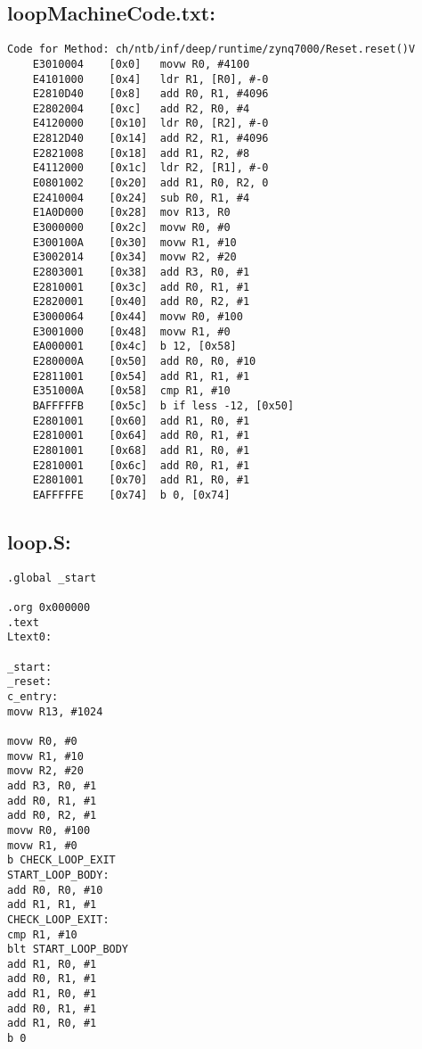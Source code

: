 \subsection{loopMachineCode.txt:}
\label{anhang:loopMachineCode.txt}
\lstset{language=plain}
\begin{lstlisting}
Code for Method: ch/ntb/inf/deep/runtime/zynq7000/Reset.reset()V
	E3010004	[0x0]	movw R0, #4100
	E4101000	[0x4]	ldr R1, [R0], #-0
	E2810D40	[0x8]	add R0, R1, #4096
	E2802004	[0xc]	add R2, R0, #4
	E4120000	[0x10]	ldr R0, [R2], #-0
	E2812D40	[0x14]	add R2, R1, #4096
	E2821008	[0x18]	add R1, R2, #8
	E4112000	[0x1c]	ldr R2, [R1], #-0
	E0801002	[0x20]	add R1, R0, R2, 0
	E2410004	[0x24]	sub R0, R1, #4
	E1A0D000	[0x28]	mov R13, R0
	E3000000	[0x2c]	movw R0, #0
	E300100A	[0x30]	movw R1, #10
	E3002014	[0x34]	movw R2, #20
	E2803001	[0x38]	add R3, R0, #1
	E2810001	[0x3c]	add R0, R1, #1
	E2820001	[0x40]	add R0, R2, #1
	E3000064	[0x44]	movw R0, #100
	E3001000	[0x48]	movw R1, #0
	EA000001	[0x4c]	b 12, [0x58]	
	E280000A	[0x50]	add R0, R0, #10
	E2811001	[0x54]	add R1, R1, #1
	E351000A	[0x58]	cmp R1, #10
	BAFFFFFB	[0x5c]	b if less -12, [0x50]	
	E2801001	[0x60]	add R1, R0, #1
	E2810001	[0x64]	add R0, R1, #1
	E2801001	[0x68]	add R1, R0, #1
	E2810001	[0x6c]	add R0, R1, #1
	E2801001	[0x70]	add R1, R0, #1
	EAFFFFFE	[0x74]	b 0, [0x74]	
\end{lstlisting}


\subsection{loop.S:}
\label{anhang:loop.S}
\begin{lstlisting}
.global _start

.org 0x000000
.text
Ltext0:

_start:
_reset:
c_entry:
movw R13, #1024

movw R0, #0
movw R1, #10
movw R2, #20
add R3, R0, #1
add R0, R1, #1
add R0, R2, #1
movw R0, #100
movw R1, #0
b CHECK_LOOP_EXIT	
START_LOOP_BODY:
add R0, R0, #10
add R1, R1, #1
CHECK_LOOP_EXIT:
cmp R1, #10
blt START_LOOP_BODY
add R1, R0, #1
add R0, R1, #1
add R1, R0, #1
add R0, R1, #1
add R1, R0, #1
b 0
\end{lstlisting}



